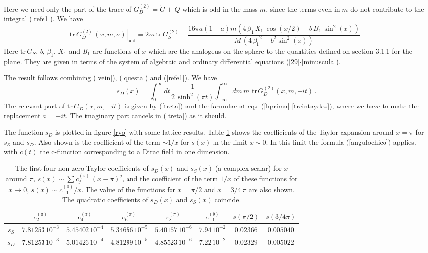 \documentclass[a4paper]{article}
\begin{document}
 
 

Here we need only the part of the trace of $G_D^{(2)}= \tilde{G}+ \, Q$ which is odd in the mass $m$, since the terms even in $m$ do not contribute to the integral (\ref{refe1}). We have
\begin{equation}
  \left. \textrm{tr}\,G^{(2)}_D\,(x,m,a)\right|_{\textrm{odd}}=2 m\, \textrm{tr}\, G_S^{(2)} - \frac{16 \pi a(1-a) m\left(4\, \beta_1\,X_1  \,\cos (x/2)  - b\,B_1 \,{\sin^2 (x)} \right)}{M\,\left( 4\,{{{\beta }_1}}^2 -b^2 \sin^2 (x)  \right)} 
\,.  \label{treta}
\end{equation}
Here $\textrm{tr} \,G_S$, $b$, $\beta_1$, $X_1$ and $B_1$ are functions of $x$ which are the analogous on the sphere to the quantities defined on section 3.1.1 for the plane. They are given in terms of the system of algebraic and ordinary differential equations (\ref{29}-\ref{minuscula}). 

  The result follows combining  (\ref{vein}), (\ref{questa}) and (\ref{refe1}). We have  
\begin{equation}
s_D(x)= \int_0^\infty dt \, \frac{1}{2\,\sinh^2(\pi t)}  \int_{-\infty}^{\infty}dm\,m\,\,\textrm{tr} \,G_D^{(2)}(x,m,-i t)\,.
\end{equation}
The relevant part of $\textrm{tr} \,G_D(x,m,-i t)$ is given by (\ref{treta}) and the formulae at eqs. (\ref{hprima}-\ref{treintaydos}), where we have to make the replacement $a=-i t$. The imaginary part cancels in (\ref{treta}) as it should. 

The function $s_D$ is plotted in figure \ref{ryo} with some lattice results. Table \ref{tatata} shows the coefficients of the Taylor expansion around $x=\pi$ for $s_S$ and $s_D$. Also shown is the coefficient of the term $\sim 1/x$ for $s(x)$ in the limit $x\sim 0$. In this limit the formula (\ref{angulochico}) applies, with $c(t)$ the c-function corresponding to a Dirac field in one dimension.

\begin{table}[t]
\centering
\begin{tabular}{|c|ccccccc|} \hline
 & $c^{(\pi)}_2$ & $c^{(\pi)}_4$ & $c^{(\pi)}_6$ & $c^{(\pi)}_8$ & $c_{-1}^{(0)}$ & $s(\pi/2)$ & $s(3/4 \pi)$   \\  \hline
$s_S$ & $7.81253\, 10^{-3}$ & $5.45402 \,10^{-4}$ & $5.34656 \,10^{-5}$ & $5.40167 \,10^{-6}$ & $7.94 \, 10^{-2}$  & $0.02366$ & $0.005040$\\
$s_D$ & $7.81253 \,10^{-3}$ & $5.01426\, 10^{-4}$ & $4.81299\, 10^{-5}$ & $4.85523\, 10^{-6}$ & $7.22 \, 10^{-2}$ & $0.02329$ & $0.005022$  \\  \hline
\end{tabular} 
\caption{The first four non zero Taylor coefficients of $s_D(x)$ and $s_S(x)$ (a complex scalar)  for $x$ around $\pi$, $s(x)\sim \sum c^{(\pi)}_j\, (x-\pi)^j$,  and the coefficient of the term $1/x$ of these functions for $x\rightarrow 0$, $s(x)\sim  c_{-1}^{(0)}/x$. The value of the functions for $x=\pi/2$ and $x=3/4\, \pi$ are also shown.  The quadratic coefficients of $s_D(x)$ and $s_S(x)$ coincide. }
\label{tatata}
\end{table}
\end{document}
